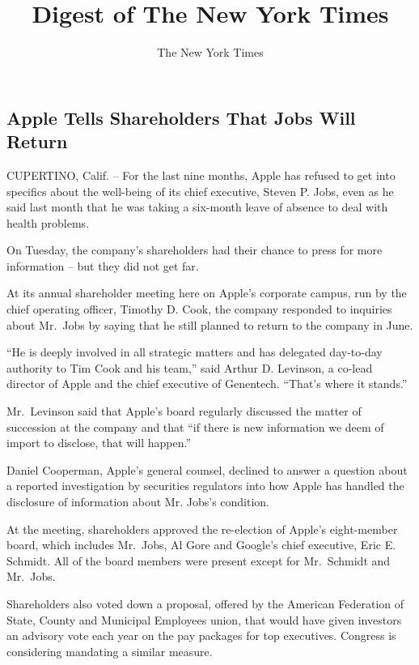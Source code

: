 \documentclass[12pt,a4paper,onecolumn]{article}
\title{Digest of The New York Times}
\author{The New York Times}
\begin{document}
\begin{CJK*}{GBK}{song}
\date{}
\tableofcontents
\pagebreak
\section{Apple Tells Shareholders That Jobs Will Return}

CUPERTINO, Calif. -- For the last nine months, Apple has refused to get into specifics about the
well-being of its chief executive, Steven P. Jobs, even as he said last month that he was taking a
six-month leave of absence to deal with health problems.

On Tuesday, the company's shareholders had their chance to press for more information -- but they
did not get far.

At its annual shareholder meeting here on Apple's corporate campus, run by the chief operating
officer, Timothy D. Cook, the company responded to inquiries about Mr.~Jobs by saying that he still
planned to return to the company in June.

``He is deeply involved in all strategic matters and has delegated day-to-day authority to Tim Cook
and his team,'' said Arthur D. Levinson, a co-lead director of Apple and the chief executive of
Genentech. ``That's where it stands.''

Mr.~Levinson said that Apple's board regularly discussed the matter of succession at the company and
that ``if there is new information we deem of import to disclose, that will happen.''

Daniel Cooperman, Apple's general counsel, declined to answer a question about a reported
investigation by securities regulators into how Apple has handled the disclosure of information
about Mr. Jobs's condition.

At the meeting, shareholders approved the re-election of Apple’s eight-member board, which includes
Mr.~Jobs, Al Gore and Google's chief executive, Eric E. Schmidt. All of the board members were
present except for Mr.~Schmidt and Mr.~Jobs.

Shareholders also voted down a proposal, offered by the American Federation of State, County and
Municipal Employees union, that would have given investors an advisory vote each year on the pay
packages for top executives. Congress is considering mandating a similar measure.


\end{CJK*}
\end{document}
